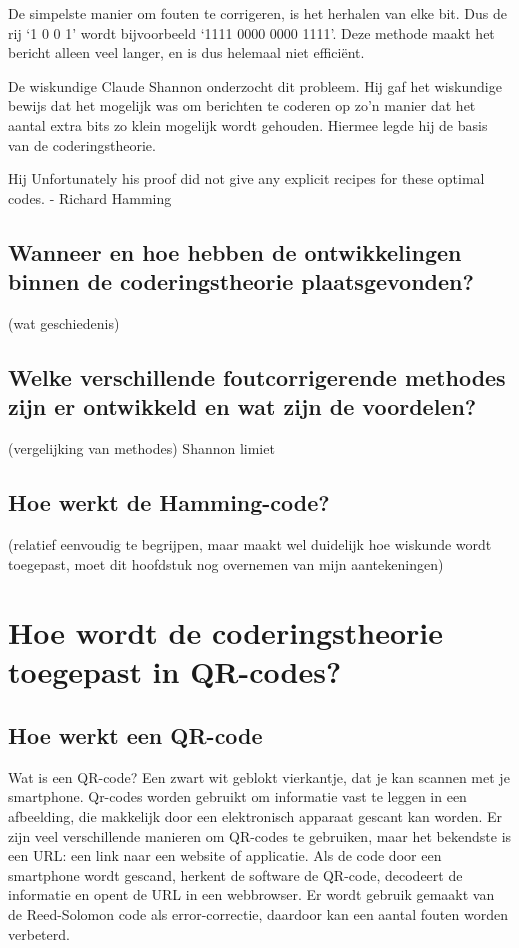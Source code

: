 \documentclass{article}
\begin{document}
De simpelste manier om fouten te corrigeren, is het herhalen van elke bit. Dus de rij ‘1 0 0 1’ wordt bijvoorbeeld ‘1111 0000 0000 1111’. Deze methode maakt het bericht alleen veel langer, en is dus helemaal niet efficiënt.

De wiskundige Claude Shannon onderzocht dit probleem. Hij gaf het wiskundige bewijs dat het mogelijk was om berichten te coderen op zo'n manier dat het aantal extra bits zo klein mogelijk wordt gehouden. Hiermee legde hij de basis van de coderingstheorie.

Hij
Unfortunately his proof did not give any explicit recipes for these optimal codes.
- Richard Hamming
\subsection{Wanneer en hoe hebben de ontwikkelingen binnen de coderingstheorie plaatsgevonden?}
(wat geschiedenis)
\subsection{Welke verschillende foutcorrigerende methodes zijn er ontwikkeld en wat zijn de voordelen?}
(vergelijking van methodes)
Shannon limiet
\subsection{Hoe werkt de Hamming-code?}
(relatief eenvoudig te begrijpen, maar maakt wel duidelijk hoe wiskunde wordt toegepast, moet dit hoofdstuk nog overnemen van mijn aantekeningen)
\section{Hoe wordt de coderingstheorie toegepast in QR-codes?}
\subsection{Hoe werkt een QR-code}
Wat is een QR-code? Een zwart wit geblokt vierkantje, dat je kan scannen met je smartphone. Qr-codes worden gebruikt om informatie vast te leggen in een afbeelding, die makkelijk door een elektronisch apparaat gescant kan worden. Er zijn veel verschillende manieren om QR-codes te gebruiken, maar het bekendste is een URL: een link naar een website of applicatie. Als de code door een smartphone wordt gescand, herkent de software de QR-code, decodeert de informatie en opent de URL in een webbrowser. Er wordt gebruik gemaakt van de Reed-Solomon code als error-correctie, daardoor kan een aantal fouten worden verbeterd.
\end{document}

